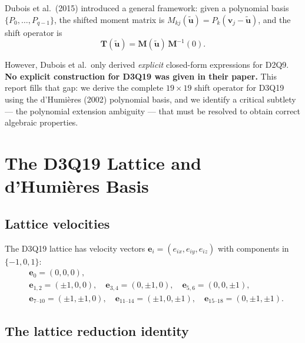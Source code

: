 \documentclass[11pt,a4paper]{article}
\newcommand{\vect}[1]{\bm{#1}}
\newcommand{\mat}[1]{\bm{#1}}
\newcommand{\Tmat}{\mat{T}}
\newcommand{\Mmat}{\mat{M}}
\begin{document}
Dubois et al.\ (2015) introduced a general framework: given a polynomial basis $\{P_0, \ldots, P_{q-1}\}$, the shifted moment matrix is $M_{kj}(\tilde{\vect{u}}) = P_k(\vect{v}_j - \tilde{\vect{u}})$, and the shift operator is
\begin{equation}\label{eq:T-def}
  \Tmat(\tilde{\vect{u}}) = \Mmat(\tilde{\vect{u}})\,\Mmat^{-1}(0).
\end{equation}

However, Dubois et al.\ only derived \emph{explicit} closed-form expressions for D2Q9.
\textbf{No explicit construction for D3Q19 was given in their paper.}
This report fills that gap: we derive the complete $19\times 19$ shift operator for D3Q19 using the d'Humi\`eres (2002) polynomial basis, and we identify a critical subtlety --- the polynomial extension ambiguity --- that must be resolved to obtain correct algebraic properties.

\section{The D3Q19 Lattice and d'Humi\`eres Basis}

\subsection{Lattice velocities}

The D3Q19 lattice has velocity vectors $\vect{e}_i = (e_{ix}, e_{iy}, e_{iz})$ with components in $\{-1, 0, 1\}$:
\begin{equation}\label{eq:lattice}
\begin{aligned}
  &\vect{e}_0 = (0,0,0), \\
  &\vect{e}_{1,2} = (\pm 1,0,0),\quad \vect{e}_{3,4} = (0,\pm 1,0),\quad \vect{e}_{5,6} = (0,0,\pm 1), \\
  &\vect{e}_{7\text{--}10} = (\pm 1,\pm 1,0),\quad \vect{e}_{11\text{--}14} = (\pm 1,0,\pm 1),\quad \vect{e}_{15\text{--}18} = (0,\pm 1,\pm 1).
\end{aligned}
\end{equation}

\subsection{The lattice reduction identity}\label{sec:lattice-id}
\end{document}
